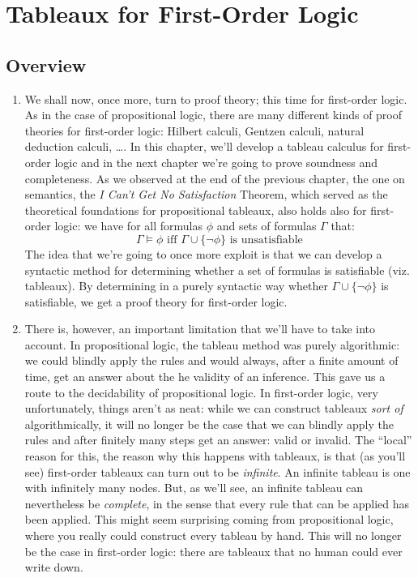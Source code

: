 \chapter{Tableaux for First-Order Logic}

\section{Overview}

	\begin{enumerate}[\thesection.1]

		\item We shall now, once more, turn to proof theory; this time for first-order logic. As in the case of propositional logic, there are many different kinds of proof theories for first-order logic: Hilbert calculi, Gentzen calculi, natural deduction calculi, \dots. In this chapter, we'll develop a tableau calculus for first-order logic and in the next chapter we're going to prove soundness and completeness. As we observed at the end of the previous chapter, the one on semantics, the \emph{I Can't Get No Satisfaction} Theorem, which served as the theoretical foundations for propositional tableaux, also holds also for first-order logic: we have for all formulas $\phi$ and sets of formulas $\Gamma$ that:
		\[\Gamma\vDash\phi\text{ iff }\Gamma\cup\{\neg\phi\}\text{ is unsatisfiable}\]
		The idea that we're going to once more exploit is that we can develop a syntactic method for determining whether a set of formulas is satisfiable (viz. tableaux). By determining in a purely syntactic way whether $\Gamma\cup\{\neg\phi\}$ is satisfiable, we get a proof theory for first-order logic. 
		
		\item There is, however, an important limitation that we'll have to take into account. In propositional logic, the tableau method was purely algorithmic: we could blindly apply the rules and would always, after a finite amount of time, get an answer about the he validity of an inference. This gave us a route to the decidability of propositional logic. In first-order logic, very unfortunately, things aren't as neat: while we can construct tableaux \emph{sort of} algorithmically, it will no longer be the case that we can blindly apply the rules and after finitely many steps get an answer: valid or invalid. The ``local'' reason for this, the reason why this happens with tableaux, is that (as you'll see) first-order tableaux can turn out to be \emph{infinite}. An infinite tableau is one with infinitely many nodes. But, as we'll see, an infinite tableau can nevertheless be \emph{complete}, in the sense that every rule that can be applied has been applied. This might seem surprising coming from propositional logic, where you really could construct every tableau by hand. This will no longer be the case in first-order logic: there are tableaux that no human could ever write down. 
		

\end{enumerate}
